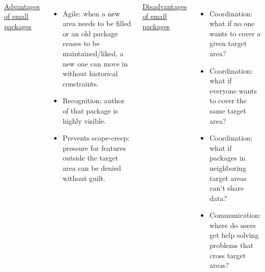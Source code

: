 \documentclass[aspectratio=169]{beamer}
\begin{document}
\begin{frame}{\mbox{ }}
\begin{columns}[t]
\underline{\large Advantages of small packages}

\vspace{0.2 cm}
\begin{itemize}
\item<2-> Agile: when a new area needs to be filled or an old package ceases to be maintained/liked, a new one can move in without historical constraints.

\item<3-> Recognition: author of that package is highly visible.

\item<4-> Prevents scope-creep: pressure for features outside the target area can be denied without guilt.

\end{itemize}

\underline{\large Disadvantages of small packages}

\vspace{0.2 cm}
\begin{itemize}
\item<5-> Coordination: what if no one wants to cover a given target area?

\item<6-> Coordination: what if everyone wants to cover the same target area?

\item<7-> Coordination: what if packages in neighboring target areas can't share data?

\item<8-> Communication: where do users get help solving problems that cross target areas?
\end{itemize}

\end{columns}
\end{frame}
\end{document}
